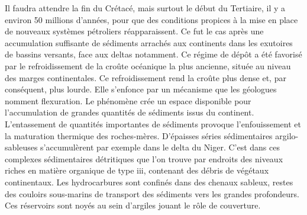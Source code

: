 \documentclass[8pt]{article}
\begin{document}
Il faudra attendre la fin du Crétacé, mais surtout le début du Tertiaire, il y a environ 50 millions d'années, pour que des conditions propices à la mise en place de nouveaux systèmes pétroliers réapparaissent. Ce fut le cas après une accumulation suffisante de sédiments arrachés aux continents dans les exutoires de bassins versants, face aux deltas notamment. Ce régime de dépôt a été favorisé par le refroidissement de la croûte océanique la plus ancienne, située au niveau des marges continentales. Ce refroidissement rend la croûte plus dense et, par conséquent, plus lourde. Elle s'enfonce par un mécanisme que les géologues nomment flexuration. Le phénomène crée un espace disponible pour l'accumulation de grandes quantités de sédiments issus du continent. L'entassement de quantités importantes de sédiments provoque l'enfouissement et la maturation thermique des roches-mères. D'épaisses séries sédimentaires argilo-sableuses s'accumulèrent par exemple dans le delta du Niger. C'est dans ces complexes sédimentaires détritiques que l'on trouve par endroits des niveaux riches en matière organique de type iii, contenant des débris de végétaux continentaux. Les hydrocarbures sont confinés dans des chenaux sableux, restes des couloirs sous-marins de transport des sédiments vers les grandes profondeurs. Ces réservoirs sont noyés au sein d'argiles jouant le rôle de couverture.\\
\end{document}
